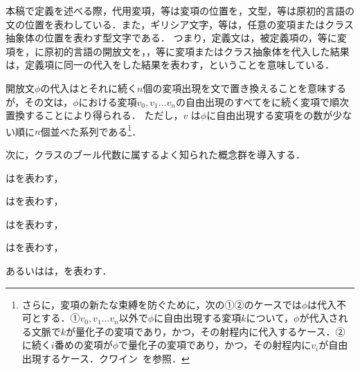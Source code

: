 本稿で定義を述べる際，代用変項，等は変項の位置を，文型，等は原初的言語の文の位置を表わしている．また，ギリシア文字\kagi{$\alpha$}，\kagi{$\beta$}等は，任意の変項またはクラス抽象体の位置を表わす型文字である．
つまり，定義文は，被定義項の，等に変項を，に原初的言語の開放文を，\kagi{$\alpha$}，\kagi{$\beta$}等に変項またはクラス抽象体を代入した結果は，定義項に同一の代入をした結果を表わす，ということを意味している．

開放文$\phi$の代入はとそれに続く$n$個の変項出現を文で置き換えることを意味するが，その文は，$\phi$における変項$v_0,v_1\dots v_n$の自由出現のすべてをに続く変項で順次置換することにより得られる． ただし，$v$ は$\phi$に自由出現する変項をの数が少ない順に$n$個並べた系列である\footnote{
    さらに，変項の新たな束縛を防ぐために，次の①②のケースでは$\phi$は代入不可とする．①$v_0,v_1\dots v_n$以外で$\phi$に自由出現する変項$k$について，$\phi$が代入される文脈で$k$が量化子の変項であり，かつ，その射程内に代入するケース．②に続く$i$番めの変項が$\phi$で量化子の変項であり，かつ，その射程内に$v_i$が自由出現するケース．クワイン~\cite[pp.\,154--156]{クワインb}を参照．
}．

次に，クラスのブール代数に属するよく知られた概念群を導入する．

\begin{df}[部分クラス]
\label{df:部分クラス}
\kagi{$
    \alpha\subseteq\beta
$}はを表わす，
\end{df}

\begin{df}[真部分クラス]
\label{df:真部分クラス}
\kagi{$
    \alpha\subset\beta
$}は\kagi{$
    \alpha\subseteq\beta\not\subseteq\alpha
$}を表わす，
\end{df}

\begin{df}[合併]
\label{df:合併}
\kagi{$
    \alpha \cup \beta
$}はを表わす，
\end{df}

\begin{df}[共通部分]
\label{df:共通部分}
\kagi{$
    \alpha \cap \beta
$}はを表わす，
\end{df}

\begin{df}[補クラス]
\label{df:補クラス}
\kagi{$\bar{\alpha}$}あるいは\kagi{$\barl{\alpha}$}は，を表わす．
\end{df}

